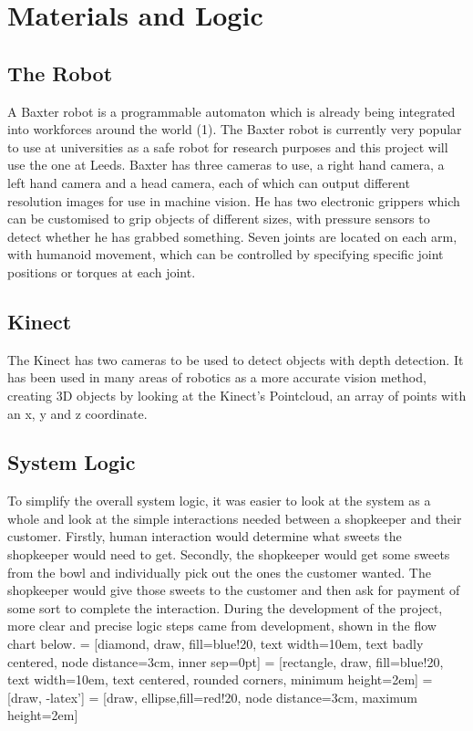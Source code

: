 \chapter{Materials and Logic}
\label{chapter3}
\section{The Robot}
A Baxter robot is a programmable automaton which is already being integrated into workforces around the world (1). The Baxter robot is currently very popular to use at universities as a safe robot for research purposes and this project will use the one at Leeds. Baxter has three cameras to use, a right hand camera, a left hand camera and a head camera, each of which can output different resolution images for use in machine vision. He has two electronic grippers which can be customised to grip objects of different sizes, with pressure sensors to detect whether he has grabbed something. Seven joints are located on each arm, with humanoid movement, which can be controlled by specifying specific joint positions or torques at each joint.
\section{Kinect}
The Kinect has two cameras to be used to detect objects with depth detection. It has been used in many areas of robotics as a more accurate vision method, creating 3D objects by looking at the Kinect's Pointcloud, an array of points with an x, y and z coordinate.
\section{System Logic}
To simplify the overall system logic, it was easier to look at the system as a whole and look at the simple interactions needed between a shopkeeper and their customer. Firstly, human interaction would determine what sweets the shopkeeper would need to get. Secondly, the shopkeeper would get some sweets from the bowl and individually pick out the ones the customer wanted. The shopkeeper would give those sweets to the customer and then ask for payment of some sort to complete the interaction. During the development of the project, more clear and precise logic steps came from development, shown in the flow chart below.
\newline
 = [diamond, draw, fill=blue!20, 
    text width=10em, text badly centered, node distance=3cm, inner sep=0pt]
 = [rectangle, draw, fill=blue!20, 
    text width=10em, text centered, rounded corners, minimum height=2em]
 = [draw, -latex']
 = [draw, ellipse,fill=red!20, node distance=3cm,
    maximum height=2em]
    
